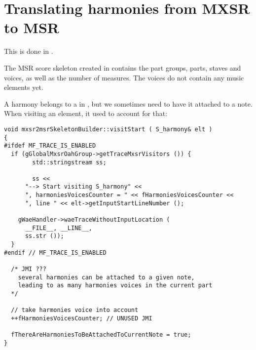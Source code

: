 \section{Translating harmonies from MXSR to MSR}

This is done in \mxsrToMsr{}.

The MSR score skeleton created in  contains the part groups, parts, staves and voices, as well as the number of measures. The voices do not contain any music elements yet.

A harmony belongs to a  in \mxml, but we sometimes need to have it attached to a note. When visiting an  element,  it used to account for that:%
\begin{lstlisting}[language=CPlusPlus]
void mxsr2msrSkeletonBuilder::visitStart ( S_harmony& elt )
{
#ifdef MF_TRACE_IS_ENABLED
  if (gGlobalMxsrOahGroup->getTraceMxsrVisitors ()) {
		std::stringstream ss;

		ss <<
      "--> Start visiting S_harmony" <<
      ", harmoniesVoicesCounter = " << fHarmoniesVoicesCounter <<
      ", line " << elt->getInputStartLineNumber ();

    gWaeHandler->waeTraceWithoutInputLocation (
      __FILE__, __LINE__,
      ss.str ());
  }
#endif // MF_TRACE_IS_ENABLED

  /* JMI ???
    several harmonies can be attached to a given note,
    leading to as many harmonies voices in the current part
  */

  // take harmonies voice into account
  ++fHarmoniesVoicesCounter; // UNUSED JMI

  fThereAreHarmoniesToBeAttachedToCurrentNote = true;
}
\end{lstlisting}

